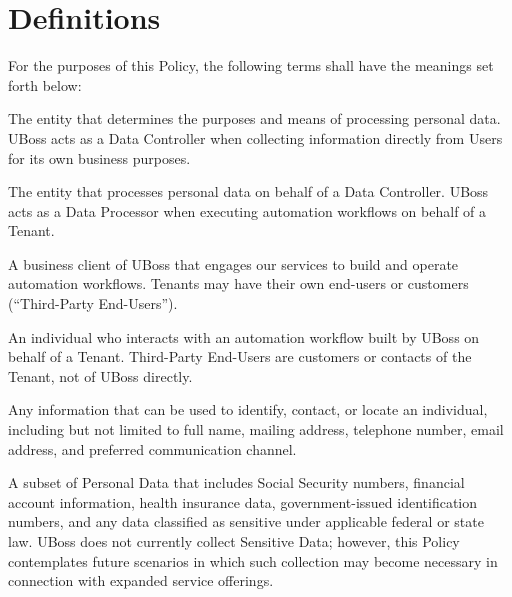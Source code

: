 \documentclass[11pt, letterpaper]{article}
\begin{document}
\section{Definitions}

For the purposes of this Policy, the following terms shall have the meanings set forth below:

\begin{description}[style=nextline, leftmargin=1em, font=\bfseries\color{ubossdarkgray}]

    \item[Data Controller]
    The entity that determines the purposes and means of processing personal data.
    UBoss acts as a Data Controller when collecting information directly from Users for
    its own business purposes.

    \item[Data Processor]
    The entity that processes personal data on behalf of a Data Controller. UBoss acts
    as a Data Processor when executing automation workflows on behalf of a Tenant.

    \item[Tenant]
    A business client of UBoss that engages our services to build and operate automation
    workflows. Tenants may have their own end-users or customers (``Third-Party End-Users'').

    \item[Third-Party End-User]
    An individual who interacts with an automation workflow built by UBoss on behalf of a
    Tenant. Third-Party End-Users are customers or contacts of the Tenant, not of UBoss
    directly.

    \item[Personal Data / Personally Identifiable Information (PII)]
    Any information that can be used to identify, contact, or locate an individual,
    including but not limited to full name, mailing address, telephone number, email
    address, and preferred communication channel.

    \item[Sensitive Data]
    A subset of Personal Data that includes Social Security numbers, financial account
    information, health insurance data, government-issued identification numbers, and
    any data classified as sensitive under applicable federal or state law. UBoss does
    not currently collect Sensitive Data; however, this Policy contemplates future
    scenarios in which such collection may become necessary in connection with expanded
    service offerings.


\end{description}
\end{document}
